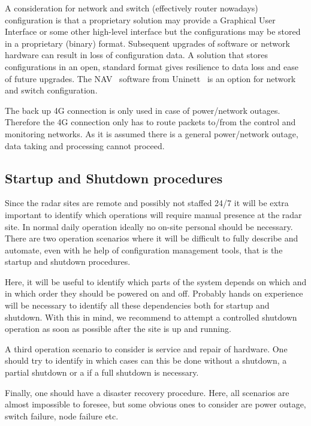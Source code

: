 \documentclass[12pt,a4paper]{article}
\begin{document}
A consideration for network and switch (effectively router nowadays) configuration is that a proprietary solution may provide a Graphical User Interface or some other high-level interface but the configurations may be stored in a proprietary (binary) format.
Subsequent upgrades of software or network hardware can result in loss of configuration data.
A solution that stores configurations in an open, standard format gives resilience to data loss and ease of future upgrades. 
The NAV~\cite{nav} software from Uninett~\cite{uninett} is an option for network and switch configuration.

The back up 4G connection is only used in case of power/network outages.
Therefore the 4G connection only has to route packets to/from the control and monitoring networks.
As it is assumed there is a general power/network outage, data taking and processing cannot proceed.


\subsection{Startup and Shutdown procedures} \label{ssec:power}

Since the radar sites are remote and possibly not staffed 24/7 it will be extra important to identify which operations will require manual presence at the radar site. In normal daily operation ideally no on-site personal should be necessary. 
%
There are two operation scenarios where it will be difficult to fully describe and automate, even with he help of configuration management tools, that is the startup and shutdown procedures. 

Here, it will be useful to identify which parts of the system depends on which and in which order they should be powered on and off. Probably hands on experience will be necessary to identify all these dependencies both for startup and shutdown. With this in mind, we recommend to attempt a controlled shutdown operation as soon as possible after the site is up and running.

A third operation scenario to consider is service and repair of hardware. One should try to identify in which cases can this be done without a shutdown, a partial shutdown or a if a full shutdown is necessary. 

Finally, one should have a disaster recovery procedure.
Here, all scenarios are almost impossible to foresee, but some obvious ones to consider are power outage, switch failure, node failure etc.
\end{document}
